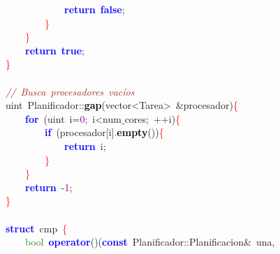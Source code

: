 \mbox{}\ \ \ \ \ \ \ \ \ \ \ \ \textbf{\textcolor{Blue}{return}}\ \textbf{\textcolor{Blue}{false}}\textcolor{BrickRed}{;} \\
\mbox{}\ \ \ \ \ \ \ \ \textcolor{Red}{\}} \\
\mbox{}\ \ \ \ \textcolor{Red}{\}} \\
\mbox{}\ \ \ \ \textbf{\textcolor{Blue}{return}}\ \textbf{\textcolor{Blue}{true}}\textcolor{BrickRed}{;} \\
\mbox{}\textcolor{Red}{\}} \\
\mbox{} \\
\mbox{}\textit{\textcolor{Brown}{//\ Busca\ procesadores\ vacíos}} \\
\mbox{}\textcolor{TealBlue}{uint}\ Planificador\textcolor{BrickRed}{::}\textbf{\textcolor{Black}{gap}}\textcolor{BrickRed}{(}\textcolor{TealBlue}{vector\textless{}Tarea\textgreater{}}\ \textcolor{BrickRed}{\&}procesador\textcolor{BrickRed}{)}\textcolor{Red}{\{} \\
\mbox{}\ \ \ \ \textbf{\textcolor{Blue}{for}}\ \textcolor{BrickRed}{(}\textcolor{TealBlue}{uint}\ i\textcolor{BrickRed}{=}\textcolor{Purple}{0}\textcolor{BrickRed}{;}\ i\textcolor{BrickRed}{\textless{}}num$\_$cores\textcolor{BrickRed}{;}\ \textcolor{BrickRed}{++}i\textcolor{BrickRed}{)}\textcolor{Red}{\{} \\
\mbox{}\ \ \ \ \ \ \ \ \textbf{\textcolor{Blue}{if}}\ \textcolor{BrickRed}{(}procesador\textcolor{BrickRed}{[}i\textcolor{BrickRed}{].}\textbf{\textcolor{Black}{empty}}\textcolor{BrickRed}{())}\textcolor{Red}{\{} \\
\mbox{}\ \ \ \ \ \ \ \ \ \ \ \ \textbf{\textcolor{Blue}{return}}\ i\textcolor{BrickRed}{;} \\
\mbox{}\ \ \ \ \ \ \ \ \textcolor{Red}{\}} \\
\mbox{}\ \ \ \ \textcolor{Red}{\}} \\
\mbox{}\ \ \ \ \textbf{\textcolor{Blue}{return}}\ \textcolor{BrickRed}{-}\textcolor{Purple}{1}\textcolor{BrickRed}{;} \\
\mbox{}\textcolor{Red}{\}} \\
\mbox{} \\
\mbox{}\textbf{\textcolor{Blue}{struct}}\ \textcolor{TealBlue}{cmp}\ \textcolor{Red}{\{} \\
\mbox{}\ \ \ \ \textcolor{ForestGreen}{bool}\ \textbf{\textcolor{Blue}{operator}}\textcolor{BrickRed}{()(}\textbf{\textcolor{Blue}{const}}\ Planificador\textcolor{BrickRed}{::}Planificacion\textcolor{BrickRed}{\&}\ una\textcolor{BrickRed}{,} \\
